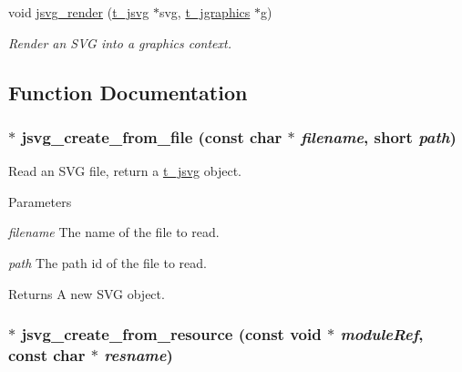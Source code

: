 \begin{DoxyCompactItemize}
void \hyperlink{group__jsvg_gab30c5cd674073ae36d226a89f0825ecd}{jsvg\_\-render} (\hyperlink{group__jgraphics_gaa3000c3aa85e3d7c87f59c44d5d7ccab}{t\_\-jsvg} $\ast$svg, \hyperlink{group__jgraphics_ga4bf27bd7e21a59a427481b909d4656e7}{t\_\-jgraphics} $\ast$g)
\begin{DoxyCompactList}\small\item\em Render an SVG into a graphics context. \item\end{DoxyCompactList}\end{DoxyCompactItemize}


\subsection{Function Documentation}
\hypertarget{group__jsvg_ga3b185fbdeba32bc51a9935a91a97eba5}{
\subsubsection[{jsvg\_\-create\_\-from\_\-file}]{$\ast$ jsvg\_\-create\_\-from\_\-file (const char $\ast$ {\em filename}, \/  short {\em path})}}
\label{group__jsvg_ga3b185fbdeba32bc51a9935a91a97eba5}


Read an SVG file, return a \hyperlink{group__jgraphics_gaa3000c3aa85e3d7c87f59c44d5d7ccab}{t\_\-jsvg} object. 
\begin{DoxyParams}{Parameters}
\item[{\em filename}]The name of the file to read. \item[{\em path}]The path id of the file to read. \end{DoxyParams}
\begin{DoxyReturn}{Returns}
A new SVG object. 
\end{DoxyReturn}
\hypertarget{group__jsvg_ga1c2545a3afc0538ead5aa46903bad73d}{
\subsubsection[{jsvg\_\-create\_\-from\_\-resource}]{$\ast$ jsvg\_\-create\_\-from\_\-resource (const void $\ast$ {\em moduleRef}, \/  const char $\ast$ {\em resname})}}
\label{group__jsvg_ga1c2545a3afc0538ead5aa46903bad73d}


